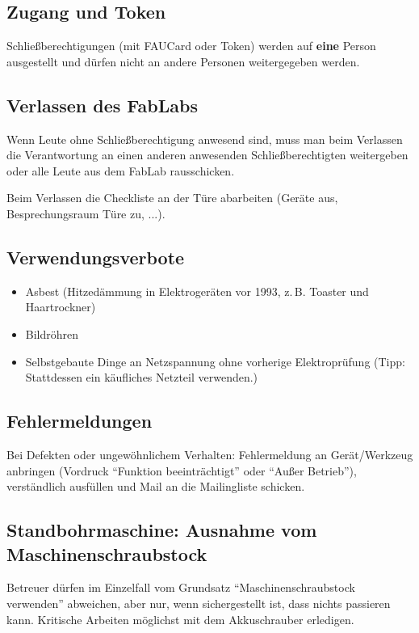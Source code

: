 \documentclass[13pt]{\basedir/fablab-document}
\begin{document}
\subsection{Zugang und Token}
Schließberechtigungen (mit FAUCard oder Token) werden auf \textbf{eine} Person ausgestellt und dürfen nicht an andere Personen weitergegeben werden.

\subsection{Verlassen des FabLabs}
Wenn Leute ohne Schließberechtigung anwesend sind, muss man beim Verlassen die Verantwortung an einen anderen anwesenden Schließberechtigten weitergeben oder alle Leute aus dem FabLab rausschicken.

Beim Verlassen die Checkliste an der Türe abarbeiten (Geräte aus, Besprechungsraum Türe zu, ...).

\subsection{Verwendungsverbote}
\begin{itemize}
	\item Asbest (Hitzedämmung in Elektrogeräten vor 1993, z.\,B. Toaster und Haartrockner)
	\item Bildröhren
	\item Selbstgebaute Dinge an Netzspannung ohne vorherige Elektroprüfung (Tipp: Stattdessen ein käufliches Netzteil verwenden.)
\end{itemize}

\subsection{Fehlermeldungen}
Bei Defekten oder ungewöhnlichem Verhalten: Fehlermeldung an Gerät/Werkzeug anbringen (Vordruck \enquote{Funktion beeinträchtigt} oder \enquote{Außer Betrieb}), verständlich ausfüllen und Mail an die Mailingliste schicken.

\subsection{Standbohrmaschine: Ausnahme vom Maschinenschraubstock}
Betreuer dürfen im Einzelfall vom Grundsatz \enquote{Maschinenschraubstock verwenden} abweichen, aber nur, wenn sichergestellt ist, dass nichts passieren kann. Kritische Arbeiten möglichst mit dem Akkuschrauber erledigen.

\end{document}
